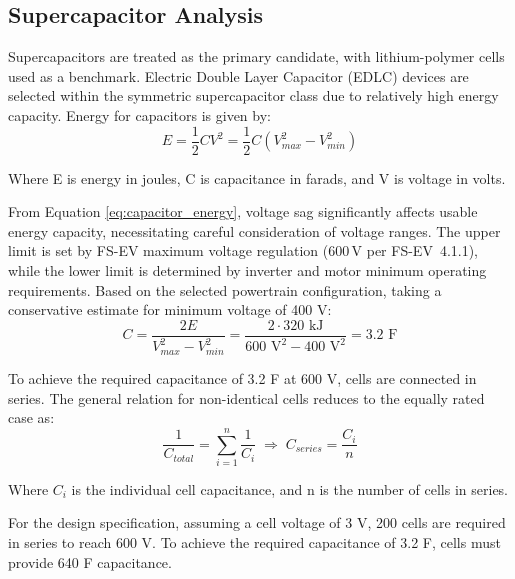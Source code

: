 \documentclass[11pt, a4paper]{report}
\numberwithin{equation}{section}
\begin{document}

\subsection{Supercapacitor Analysis}

Supercapacitors are treated as the primary candidate, with lithium-polymer cells used as a benchmark. Electric Double Layer Capacitor (EDLC) devices are selected within the symmetric supercapacitor class due to relatively high energy capacity. Energy for capacitors is given by:
\begin{equation}
E=\frac{1}{2}CV^2 = \frac{1}{2} C (V_{max}^2-V_{min}^2)
\label{eq:capacitor_energy}
\end{equation}

Where E is energy in joules, C is capacitance in farads, and V is voltage in volts.

From Equation \eqref{eq:capacitor_energy}, voltage sag significantly affects usable energy capacity, necessitating careful consideration of voltage ranges. The upper limit is set by FS-EV maximum voltage regulation (600\,V per FS-EV~4.1.1), while the lower limit is determined by inverter and motor minimum operating requirements. Based on the selected powertrain configuration, taking a conservative estimate for minimum voltage of 400 V:
\begin{equation}
C=\frac{2 E}{V_{max}^2-V_{min}^2}=\frac{2 \cdot 320\text{ kJ}}{600\text{ V}^2-400\text{ V}^2}=3.2\text{ F}
\label{eq:required_capacitance}
\end{equation}

To achieve the required capacitance of 3.2 F at 600 V, cells are connected in series. The general relation for non-identical cells reduces to the equally rated case as:
\begin{equation}
\frac{1}{C_{total}} = \sum_{i=1}^{n} \frac{1}{C_{i}}\;\Rightarrow\;C_{series}=\frac{C_{i}}{n}
\label{eq:series_capacitance}
\end{equation}

Where \(C_i\) is the individual cell capacitance, and n is the number of cells in series.

For the design specification, assuming a cell voltage of 3 V, 200 cells are required in series to reach 600 V. To achieve the required capacitance of 3.2 F, cells must provide 640 F capacitance.
\end{document}
